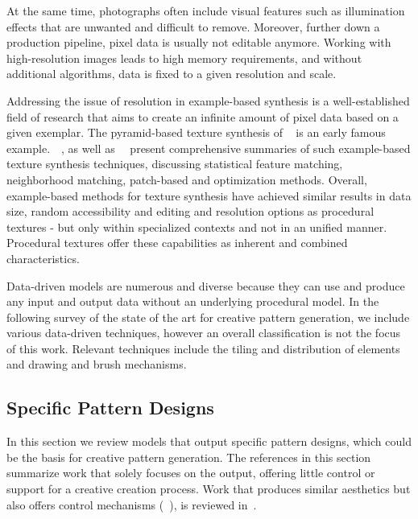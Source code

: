 At the same time, photographs often include visual features such as illumination effects that are unwanted and difficult to remove. Moreover, further down a production pipeline, pixel data is usually not editable anymore. Working with high-resolution images leads to high memory requirements, and without additional algorithms, data is fixed to a given resolution and scale.

Addressing the issue of resolution in example-based synthesis is a well-established field of research that aims to create an infinite amount of pixel data based on a given exemplar. The pyramid-based texture synthesis of \citeauthor*{heeger_1995_pbt}~\cite{heeger_1995_pbt} is an early famous example.~\citeauthor*{wei_2009_seb}~\cite{wei_2009_seb}, as well as~\citeauthor*{barnes_2017_aso}~\cite{barnes_2017_aso} present comprehensive summaries of such example-based texture synthesis techniques, discussing statistical feature matching, neighborhood matching, patch-based and optimization methods. Overall, example-based methods for texture synthesis have achieved similar results in data size, random accessibility and editing and resolution options as procedural textures - but only within specialized contexts and not in an unified manner. Procedural textures offer these capabilities as inherent and combined characteristics.

Data-driven models are numerous and diverse because they can use and produce any input and output data without an underlying procedural model. In the following survey of the state of the art for creative pattern generation, we include various data-driven techniques, however an overall classification is not the focus of this work. Relevant techniques include the tiling and distribution of elements and drawing and brush mechanisms.


\subsection{Specific Pattern Designs}
\label{subsec:specific_pattern_designs}

In this section we review models that output specific pattern designs, which could be the basis for creative pattern generation. The references in this section summarize work that solely focuses on the output, offering little control or support for a creative creation process. Work that produces similar aesthetics but also offers control mechanisms (\eg~\cite{wong_1998_cgf,yu_2012_ans,zehnder_2016_dso}), is reviewed in~.


